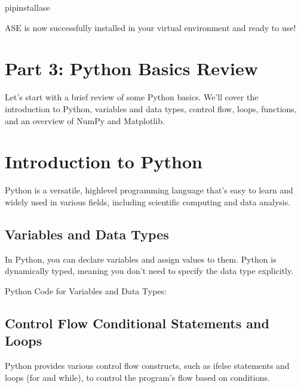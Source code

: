 \documentclass[letterpaper,10pt,english]{sphinxmanual}
\begin{document}
\begin{sphinxVerbatim}[commandchars=\\\{\}]
pipinstallase
\end{sphinxVerbatim}

\sphinxAtStartPar
ASE is now successfully installed in your virtual environment and ready to use!


\section{Part 3: Python Basics Review}
\label{\detokenize{basics/basics:part-3-python-basics-review}}
\sphinxAtStartPar
Let’s start with a brief review of some Python basics. We’ll cover the introduction to Python, variables and data types, control flow, loops, functions, and an overview of NumPy and Matplotlib.


\section{Introduction to Python}
\label{\detokenize{basics/basics:introduction-to-python}}
\sphinxAtStartPar
Python is a versatile, high\sphinxhyphen{}level programming language that’s easy to learn and widely used in various fields, including scientific computing and data analysis.


\subsection{Variables and Data Types}
\label{\detokenize{basics/basics:variables-and-data-types}}
\sphinxAtStartPar
In Python, you can declare variables and assign values to them. Python is dynamically typed, meaning you don’t need to specify the data type explicitly.

\sphinxAtStartPar
Python Code for Variables and Data Types:

\begin{sphinxVerbatim}[commandchars=\\\{\}]
  
  
  
  
\end{sphinxVerbatim}


\subsection{Control Flow \sphinxhyphen{} Conditional Statements and Loops}
\label{\detokenize{basics/basics:control-flow-conditional-statements-and-loops}}
\sphinxAtStartPar
Python provides various control flow constructs, such as if\sphinxhyphen{}else statements and loops (for and while), to control the program’s flow based on conditions.
\end{document}
